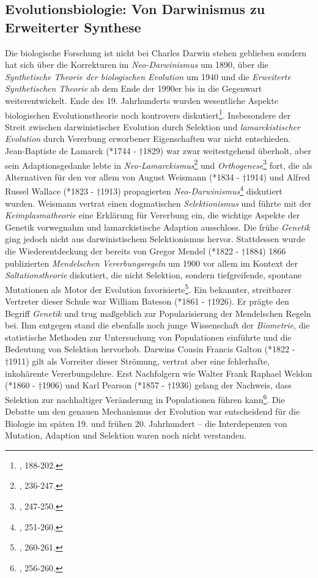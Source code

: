 \documentclass[openany,twoside,twocolumn]{book}
\let\rmarkdownfootnote\footnote%
\def\footnote{\protect\rmarkdownfootnote}
\begin{document}
\hypertarget{biology}{%
\subsection{Evolutionsbiologie: Von Darwinismus zu Erweiterter
Synthese}\label{biology}}

Die biologische Forschung ist nicht bei Charles Darwin stehen geblieben
sondern hat sich über die Korrekturen im \emph{Neo-Darwinismus} um 1890,
über die \emph{Synthetische Theorie der biologischen Evolution} um 1940
und die \emph{Erweiterte Synthetischen Theorie} ab dem Ende der 1990er
bis in die Gegenwart weiterentwickelt. Ende des 19. Jahrhunderts wurden
wesentliche Aspekte biologischen Evolutionstheorie noch kontrovers
diskutiert\footnote{\textcite{bowler_evolution_1989}, 188-202.}.
Insbesondere der Streit zwischen darwinistischer Evolution durch
Selektion und \emph{lamarckistischer Evolution} durch Vererbung
erworbener Eigenschaften war nicht entschieden. Jean-Baptiste de Lamarck
(*1744 - †1829) war zwar weitestgehend überholt, aber sein
Adaptionsgedanke lebte in \emph{Neo-Lamarckismus}\footnote{\textcite{bowler_evolution_1989},
  236-247.} und \emph{Orthogenese}\footnote{\textcite{bowler_evolution_1989},
  247-250.} fort, die als Alternativen für den vor allem von August
Weismann (*1834 - †1914) und Alfred Russel Wallace (*1823 - †1913)
propagierten \emph{Neo-Darwinismus}\footnote{\textcite{bowler_evolution_1989},
  251-260.} diskutiert wurden. Weismann vertrat einen dogmatischen
\emph{Selektionismus} und führte mit der \emph{Keimplasmatheorie} eine
Erklärung für Vererbung ein, die wichtige Aspekte der Genetik vorwegnahm
und lamarckistische Adaption ausschloss. Die frühe \emph{Genetik} ging
jedoch nicht aus darwinistischem Selektionismus hervor. Stattdessen
wurde die Wiederentdeckung der bereits von Gregor Mendel (*1822 - †1884)
1866 publizierten \emph{Mendelschen Vererbungsregeln} um 1900 vor allem
im Kontext der \emph{Saltationstheorie} diskutiert, die nicht Selektion,
sondern tiefgreifende, spontane Mutationen als Motor der Evolution
favorisierte\footnote{\textcite{bowler_evolution_1989}, 260-261.}. Ein
bekannter, streitbarer Vertreter dieser Schule war William Bateson
(*1861 - †1926). Er prägte den Begriff \emph{Genetik} und trug
maßgeblich zur Popularisierung der Mendelschen Regeln bei. Ihm entgegen
stand die ebenfalls noch junge Wissenschaft der \emph{Biometrie}, die
statistische Methoden zur Untersuchung von Populationen einführte und
die Bedeutung von Selektion hervorhob. Darwins Cousin Francis Galton
(*1822 - †1911) gilt als Vorreiter dieser Strömung, vertrat aber eine
fehlerhafte, inkohärente Vererbungslehre. Erst Nachfolgern wie Walter
Frank Raphael Weldon (*1860 - †1906) und Karl Pearson (*1857 - †1936)
gelang der Nachweis, dass Selektion zur nachhaltiger Veränderung in
Populationen führen kann\footnote{\textcite{bowler_evolution_1989},
  256-260.}. Die Debatte um den genauen Mechanismus der Evolution war
entscheidend für die Biologie im späten 19. und frühen 20. Jahrhundert
-- die Interdepenzen von Mutation, Adaption und Selektion waren noch
nicht verstanden.
\end{document}
